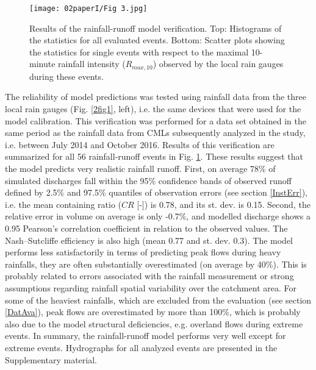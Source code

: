 \documentclass{ctuthesis}\usepackage[]{graphicx}\usepackage[]{color}
\begin{document}
\begin{figure}[h]
\begin{center}
\texttt{[image: 02paperI/Fig 3.jpg]}
\caption{Results of the rainfall-runoff model verification. Top: Histograms of the statistics for all evaluated events. Bottom: Scatter plots showing the statistics for single events with respect to the maximal 10-minute rainfall intensity ($R_{max,10}$) observed by the local rain gauges during these events.} \label{2fig3}
\end{center}
\end{figure}

The reliability of model predictions was tested using rainfall data from the three local rain gauges (Fig. \ref{2fig1}, left), i.e. the same devices that were used for the model calibration. This verification was performed for a data set obtained in the same period as the rainfall data from CMLs subsequently analyzed in the study, i.e. between July 2014 and October 2016. Results of this verification are summarized for all 56 rainfall-runoff events in Fig. \ref{2fig3}. These results suggest that the model predicts very realistic rainfall runoff. First, on average 78\% of simulated discharges fall within the 95\% confidence bands of observed runoff defined by 2.5\% and 97.5\% quantiles of observation errors (see section \ref{InstErr}), i.e. the mean containing ratio ($CR$ [-]) is 0.78, and its st. dev. is 0.15. Second, the relative error in volume on average is only -0.7\%, and modelled discharge shows a 0.95 Pearson's correlation coefficient in relation to the observed values. The Nash–Sutcliffe efficiency is also high (mean 0.77 and st. dev. 0.3). The model performs less satisfactorily in terms of predicting peak flows during heavy rainfalls, they are often substantially overestimated (on average by 40\%). This is probably related to errors associated with the rainfall measurement or strong assumptions regarding rainfall spatial variability over the catchment area. For some of the heaviest rainfalls, which are excluded from the evaluation (see section \ref{DatAva}), peak flows are overestimated by more than 100\%, which is probably also due to the model structural deficiencies, e.g. overland flows during extreme events. In summary, the rainfall-runoff model performs very well except for extreme events. Hydrographs for all analyzed events are presented in the Supplementary material. 





        
        
\end{document}
